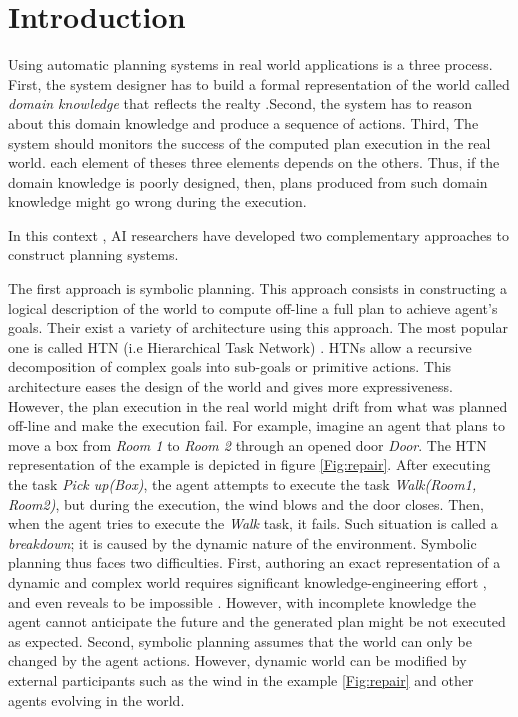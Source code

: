 \documentclass[conference]{IEEEtran}
\begin{document}
	\section{Introduction}
	\par Using automatic planning systems in real world applications is a three process. First, the system designer has to build a formal representation of the world called \emph{domain knowledge} that reflects the realty .Second, the system has to reason about this domain knowledge and produce a sequence of actions. Third, The system should monitors the success  of the computed plan execution in the real world.  each element of theses three elements depends on the others. Thus, if the domain knowledge is poorly designed, then, plans produced from such domain knowledge might go wrong during the execution.  
	\par 	In this context , AI researchers have developed two complementary approaches to  construct planning systems. 
	\par The first approach is symbolic planning. This approach consists in constructing a logical description of the world to compute  off-line a full plan to achieve agent's goals.  Their exist a variety of architecture using this approach. The most popular one is called HTN (i.e Hierarchical Task Network) \cite{erol1996hierarchical}. HTNs allow a recursive decomposition of complex goals into sub-goals or primitive actions. This architecture eases the design of the world and gives more expressiveness. However, the plan execution in the real world might drift from what was planned off-line and make the execution fail. For example, imagine an agent that plans to move a box from \textit{Room 1} to \textit{Room 2} through an opened door \textit{Door}. The HTN representation of the example is depicted in figure \ref{Fig:repair}. After executing the task \textit{Pick up(Box)}, the agent attempts to execute the task \textit{Walk(Room1, Room2)}, but during the execution, the wind blows and  the door closes. Then, when the agent tries to execute the \textit{Walk} task, it fails. Such situation is called a \emph{breakdown}; it is caused by the dynamic nature of the environment. Symbolic planning thus faces two difficulties. First, authoring an exact representation of a dynamic and complex world requires significant  knowledge-engineering effort \cite{zhuo2009learning}, and even reveals to be impossible \cite{maes1990designing}. However, with incomplete knowledge the agent cannot anticipate the future and the generated plan might be not executed as expected. Second, symbolic planning assumes that the world can only be changed by the agent actions. However, dynamic world can be modified  by external participants such as the wind in the example \ref{Fig:repair} and other agents evolving in the world.  	  
\end{document}
